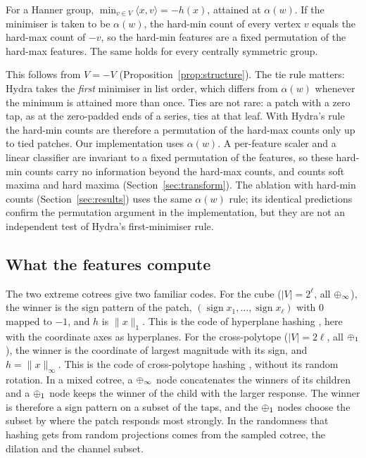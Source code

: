 \begin{proposition}
\label{prop:hardmin}
For a Hanner group, $\min_{v\in V}\langle x,v\rangle=-h(x)$, attained at $\alpha(w)$. If the
minimiser is taken to be $\alpha(w)$, the hard-min count of every vertex $v$ equals the
hard-max count of $-v$, so the hard-min features are a fixed permutation of the hard-max
features. The same holds for every centrally symmetric group.
\end{proposition}

This follows from $V=-V$ (Proposition~\ref{prop:structure}). The tie rule matters: Hydra
takes the \emph{first} minimiser in list order, which differs from $\alpha(w)$ whenever the
minimum is attained more than once. Ties are not rare: a patch with a zero tap, as at the
zero-padded ends of a series, ties at that leaf. With Hydra's rule the hard-min counts are
therefore a permutation of the hard-max counts only up to tied patches. Our implementation
uses $\alpha(w)$. A per-feature scaler and a linear classifier are invariant to a fixed
permutation of the features, so these hard-min counts carry no information beyond the
hard-max counts, and \hh{} counts soft maxima and hard maxima (Section~\ref{sec:transform}).
The ablation with hard-min counts (Section~\ref{sec:results}) uses the same $\alpha(w)$
rule; its identical predictions confirm the permutation argument in the implementation,
but they are not an independent test of Hydra's first-minimiser rule.

\subsection{What the features compute}
\label{sec:interpretation}

The two extreme cotrees give two familiar codes. For the cube ($|V|=2^\ell$, all
$\oplus_\infty$), the winner is the sign pattern of the patch,
$(\operatorname{sign}x_1,\dots,\operatorname{sign}x_\ell)$ with $0$ mapped to $-1$, and $h$
is $\|x\|_1$. This is the code of hyperplane hashing \citep{charikar2002simhash}, here with
the coordinate axes as hyperplanes. For the cross-polytope ($|V|=2\ell$, all $\oplus_1$), the
winner is the coordinate of largest magnitude with its sign, and $h=\|x\|_\infty$. This is
the code of cross-polytope hashing \citep{andoni2015crosspolytope}, without its random
rotation. In a mixed cotree, a $\oplus_\infty$ node concatenates the winners of its children and a
$\oplus_1$ node keeps the winner of the child with the larger response. The winner is
therefore a sign pattern on a subset of the taps, and the $\oplus_1$ nodes choose the subset
by where the patch responds most strongly. In \hh{} the randomness that hashing gets from
random projections comes from the sampled cotree, the dilation and the channel subset.

